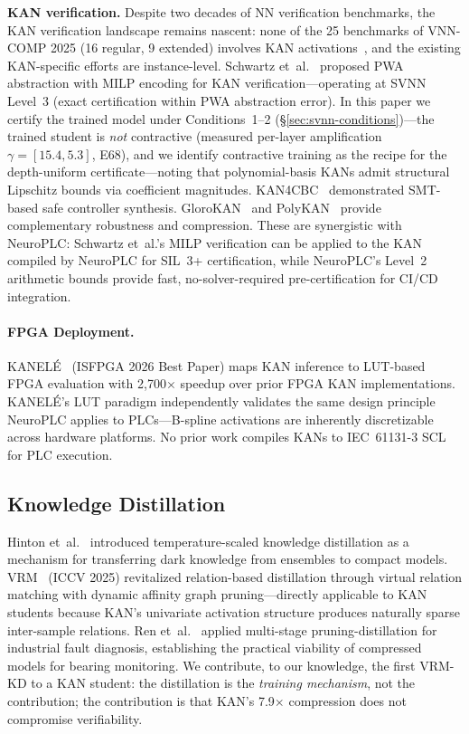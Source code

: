 \documentclass[journal,onecolumn]{IEEEtran}
\newcommand{\neuroplc}{NeuroPLC\xspace}
\begin{document}
\textbf{KAN verification.} Despite two decades of NN verification
benchmarks, the KAN verification landscape remains nascent: none of the
25 benchmarks of VNN-COMP 2025 (16 regular, 9 extended) involves KAN
activations~\cite{vnncomp2025}, and the existing KAN-specific efforts
are instance-level. Schwartz et~al.~\cite{schwartz2026optimal} proposed
PWA abstraction with MILP encoding for KAN verification---operating at SVNN
Level~3 (exact certification within PWA abstraction error). In this paper we
certify the trained model under Conditions~1--2
({\S}\ref{sec:svnn-conditions})---the trained student is \emph{not}
contractive (measured per-layer amplification $\gamma = [15.4, 5.3]$,
E68), and we identify contractive training as the recipe for the
depth-uniform certificate---noting that
polynomial-basis KANs admit structural Lipschitz bounds via coefficient
magnitudes. KAN4CBC~\cite{zhang2025kan4cbc} demonstrated
SMT-based safe controller synthesis. GloroKAN~\cite{glorokan2025} and
PolyKAN~\cite{polykan2025} provide complementary robustness and compression.
These are synergistic with \neuroplc: Schwartz et~al.'s MILP verification can
be applied to the KAN compiled by \neuroplc for SIL~3+ certification, while
\neuroplc's Level~2 arithmetic bounds provide fast, no-solver-required
pre-certification for CI/CD integration.

\paragraph{FPGA Deployment.} KANEL\'{E}~\cite{kanele2026} (ISFPGA 2026 Best Paper)
maps KAN inference to LUT-based FPGA evaluation with 2,700$\times$ speedup over
prior FPGA KAN implementations. KANEL\'{E}'s LUT paradigm independently validates
the same design principle \neuroplc applies to PLCs---B-spline activations are
inherently discretizable across hardware platforms. No prior work compiles KANs to IEC~61131-3 SCL for PLC execution.

\subsection{Knowledge Distillation}

Hinton et~al.~\cite{hinton2015distilling} introduced temperature-scaled
knowledge distillation as a mechanism for transferring dark knowledge from
ensembles to compact models. VRM~\cite{zhang2025vrm} (ICCV 2025) revitalized
relation-based distillation through virtual relation matching with dynamic
affinity graph pruning---directly applicable to KAN students because KAN's
univariate activation structure produces naturally sparse inter-sample
relations. Ren et~al.~\cite{ren2024lightweight} applied multi-stage
pruning-distillation for industrial fault diagnosis, establishing the
practical viability of compressed models for bearing monitoring. We
contribute, to our knowledge, the first VRM-KD to a KAN student: the distillation is the
\textit{training mechanism}, not the contribution; the contribution is
that KAN's 7.9$\times$ compression does not compromise verifiability.
\end{document}
